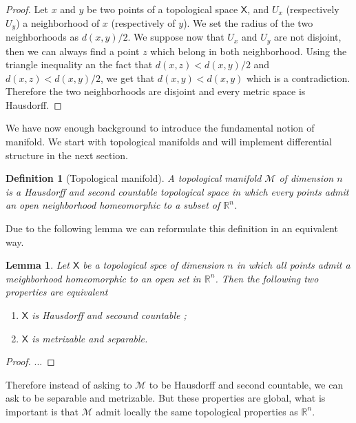 \documentclass[11pt]{book}
\newcommand{\Mcal}{\mathcal{M}}
\newcommand{\Rbb}{\mathbb{R}}
\newcommand{\Xsf}{\mathsf{X}}
\theoremstyle{break}
\newtheorem{lemma}{Lemma}
\newtheorem{definition}{Definition}
\newtheorem{proof}{Proof}
\begin{document}
\begin{proof}
Let $x$ and $y$ be two points of a topological space $\Xsf$, and $U_x$ (respectively $U_y$) a neighborhood of $x$ (respectively of $y$). We set the radius of the two neighborhoods as $d(x,y)/2$. We suppose now that $U_x$ and $U_y$ are not disjoint, then we can always find a point $z$ which belong in both neighborhood. Using the triangle inequality an the fact that $d(x,z) < d(x,y)/2$ and $d(x,z) < d(x,y)/2$, we get that $d(x,y) < d(x,y)$ which is a contradiction. Therefore the two neighborhoods are disjoint and every metric space is Hausdorff.
\end{proof}


We have now enough background to introduce the fundamental notion of manifold. We start with topological manifolds and will implement differential structure in the next section.


\begin{definition}[Topological manifold]
A topological manifold $\Mcal$ of dimension $n$ is a Hausdorff and second countable topological space in which every points admit an open neighborhood homeomorphic to a subset of $\Rbb^n$.
\end{definition}


Due to the following lemma we can reformulate this definition in an equivalent way.


\begin{lemma}
Let $\Xsf$ be a topological spce of dimension $n$ in which all points admit a meighborhood homeomorphic to an open set in $\Rbb^n$. Then the following two properties are equivalent
%
\begin{enumerate}
\vspace*{-4pt}
\setlength{\itemsep}{-1pt}
\item $\Xsf$ is Hausdorff and secound countable ;
\item $\Xsf$ is metrizable and separable.
\end{enumerate}
%
\end{lemma}


\begin{proof}
...
\end{proof}


Therefore instead of asking to $\Mcal$ to be Hausdorff and second countable, we can ask to be separable and metrizable. But these properties are global, what is important is that $\Mcal$ admit locally the same topological properties as $\Rbb^n$. 


\bigskip
\end{document}
